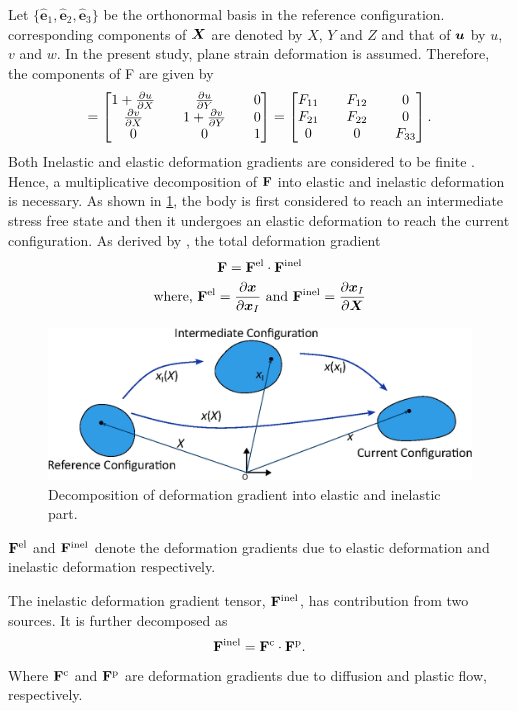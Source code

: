 Let $\{\hat{\bm{e}}_1, \hat{\bm{e}}_2, \hat{\bm{e}}_3\}$ be the orthonormal basis in the reference configuration. corresponding components of ${\bm{X}}$ are denoted by $X$, $Y$ and $Z$ and that of ${\bm{u}}$ by $u$, $v$ and $w$. In the present study, plane strain deformation is assumed. Therefore, the components of F are given by \citep{2009ContMechLai} 
\begin{align}
[\F] = 
\begin{bmatrix}
       1 + \pdiff{u}{X} && \pdiff{u}{Y} && 0 \\
       \pdiff{v}{X} && 1 + \pdiff{v}{Y} && 0 \\
       0 && 0 && 1
\end{bmatrix} = \tensor{F}. \label{eq:F_tensor}
\end{align}
Both Inelastic and elastic deformation gradients are considered to be finite \citep{2011JMPSBower}. Hence, a multiplicative decomposition of $\mathbf{F}$ into elastic and inelastic deformation is necessary. As shown in \ref{fig:decomposition}, the body is first considered to reach an intermediate stress free state and then it undergoes an elastic deformation to reach the current configuration. As derived by \citet{1969Lee}, the total deformation gradient   
\begin{gather}
\mathbf{F} = \mathbf{F}^{{\rm{el}}} \cdot  \mathbf{F}^{{\rm{inel}}} \label{eq:F_decomposition} \\
\text{where, } \mathbf{F}^{{\rm{el}}} = \frac{\partial {\bm{x}}}{\partial {\bm{x}}_I} \text{ and } \mathbf{F}^{{\rm{inel}}} = \frac{\partial {\bm{x}}_{I}}{\partial {\bm{X}}} \nonumber
\end{gather}
\begin{figure}[H]
    \centering
    \includegraphics[width=\textwidth]{figures/mathFormFigs/decomposition.eps}
    \caption{Decomposition of deformation gradient into elastic and inelastic part.}
    \label{fig:decomposition}
\end{figure}
$\mathbf{F}^{{\rm{el}}}$ and $\mathbf{F}^{{\rm{inel}}}$ denote the deformation gradients due to elastic deformation and inelastic deformation respectively.

The inelastic deformation gradient tensor, $\mathbf{F}^{{\rm{inel}}}$, has contribution from two sources. It is further decomposed as 
\begin{gather}
    \mathbf{F}^{\rm{inel}} = \mathbf{F}^{\rm{c}} \cdot \mathbf{F}^{\rm{p}}. \label{eq:Finel_decomposition}
\end{gather}
Where $\mathbf{F}^{\rm{c}}$ and $\mathbf{F}^{\rm{p}}$ are deformation gradients due to diffusion and plastic flow, respectively.

